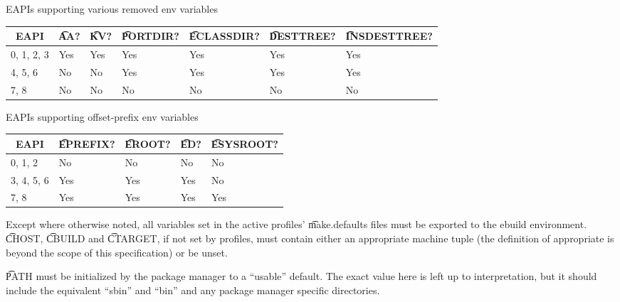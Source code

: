 \begin{centertable}{EAPIs supporting various removed env variables}
    \label{tab:removed-env-vars-table}
    \begin{tabular}{lllllll}
      \toprule
      \multicolumn{1}{c}{\textbf{EAPI}} &
      \multicolumn{1}{c}{\textbf{\t{AA}?}} &
      \multicolumn{1}{c}{\textbf{\t{KV}?}} &
      \multicolumn{1}{c}{\textbf{\t{PORTDIR}?}} &
      \multicolumn{1}{c}{\textbf{\t{ECLASSDIR}?}} &
      \multicolumn{1}{c}{\textbf{\t{DESTTREE}?}} &
      \multicolumn{1}{c}{\textbf{\t{INSDESTTREE}?}} \\
      \midrule
      0, 1, 2, 3        & Yes & Yes & Yes & Yes & Yes & Yes \\
      4, 5, 6           & No  & No  & Yes & Yes & Yes & Yes \\
      7, 8              & No  & No  & No  & No  & No  & No  \\
      \bottomrule
    \end{tabular}
\end{centertable}

\begin{centertable}{EAPIs supporting offset-prefix env variables}
    \label{tab:offset-env-vars-table}
    \begin{tabular}{lllll}
      \toprule
      \multicolumn{1}{c}{\textbf{EAPI}} &
      \multicolumn{1}{c}{\textbf{\t{EPREFIX}?}} &
      \multicolumn{1}{c}{\textbf{\t{EROOT}?}} &
      \multicolumn{1}{c}{\textbf{\t{ED}?}} &
      \multicolumn{1}{c}{\textbf{\t{ESYSROOT}?}} \\
      \midrule
      0, 1, 2           & No  & No  & No  & No  \\
      3, 4, 5, 6        & Yes & Yes & Yes & No  \\
      7, 8              & Yes & Yes & Yes & Yes \\
      \bottomrule
    \end{tabular}
\end{centertable}

Except where otherwise noted, all variables set in the active profiles' \t{make.defaults} files must
be exported to the ebuild environment. \t{CHOST}, \t{CBUILD} and \t{CTARGET}, if not set by
profiles, must contain either an appropriate machine tuple (the definition of appropriate is beyond
the scope of this specification) or be unset.

\t{PATH} must be initialized by the package manager to a ``usable'' default.  The exact value here
is left up to interpretation, but it should include the equivalent ``sbin'' and ``bin'' and any
package manager specific directories.

